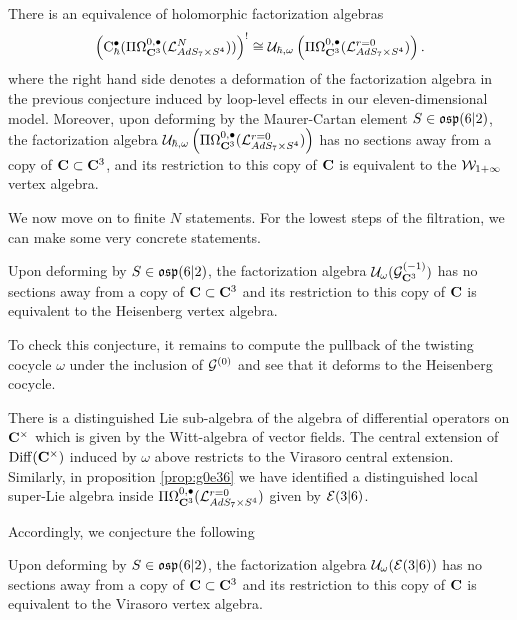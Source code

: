\begin{conj}
There is an equivalence of holomorphic factorization algebras \[ \left( {\rm C}^\bullet_\hbar (\Pi\Omega^{0,\bullet}_{\mathbf{C}^3} (\mathcal{L}^N_{AdS_7\times S^4}))\right)^!\cong \mathcal{U}_{\hbar, \omega} \left ( \Pi\Omega^{0,\bullet}_{\mathbf{C}^3} (\mathcal{L}^{r=0}_{AdS_7\times S^4} )\right ).\] where the right hand side denotes a deformation of the factorization algebra in the previous conjecture induced by loop-level effects in our eleven-dimensional model. Moreover, upon deforming by the Maurer-Cartan element $S\in \mathfrak{osp}(6|2)$, the factorization algebra $\mathcal{U}_{\hbar, \omega} \left ( \Pi\Omega^{0,\bullet}_{\mathbf{C}^3} (\mathcal{L}^{r=0}_{AdS_7\times S^4} )\right )$ has no sections away from a copy of $\mathbf{C}\subset \mathbf{C}^3$, and its restriction to this copy of $\mathbf{C}$ is equivalent to the $\mathcal{W}_{1+\infty}$ vertex algebra.
\end{conj}

\parsec[]
We now move on to finite $N$ statements. For the lowest steps of the filtration, we can make some very concrete statements.

\begin{conj}
Upon deforming by $S\in \mathfrak{osp}(6|2)$, the factorization algebra $\mathcal{U}_\omega (\mathcal{G}^{(-1)}_{\mathbf{C}^3} )$ has no sections away from a copy of $\mathbf{C}\subset \mathbf{C}^3$ and its restriction to this copy of $\mathbf{C}$ is equivalent to the Heisenberg vertex algebra.
\end{conj}
To check this conjecture, it remains to compute the pullback of the twisting cocycle $\omega$ under the inclusion of $\mathcal{G}^{(0)}$ and see that it deforms to the Heisenberg cocycle. 

\parsec[]
There is a distinguished Lie sub-algebra of the algebra of differential operators on $\mathbf{C}^\times$ which is given by the Witt-algebra of vector fields. The central extension of $\operatorname{Diff} (\mathbf{C}^\times)$ induced by $\omega$ above restricts to the Virasoro central extension. Similarly, in proposition \ref{prop:g0e36} we have identified a distinguished local super-Lie algebra inside $\Pi\Omega^{0,\bullet} _{\mathbf{C}^3}(\mathcal{L}^{r=0} _{AdS_7\times S^4} )$ given by $\mathcal{E}(3|6)$.

Accordingly, we conjecture the following
\begin{conj}
Upon deforming by $S\in \mathfrak{osp}(6|2)$, the factorization algebra $\mathcal{U}_\omega( \mathcal{E}(3|6) )$ has no sections away from a copy of $\mathbf{C}\subset \mathbf{C}^3$ and its restriction to this copy of $\mathbf{C}$ is equivalent to the Virasoro vertex algebra.
\end{conj}


